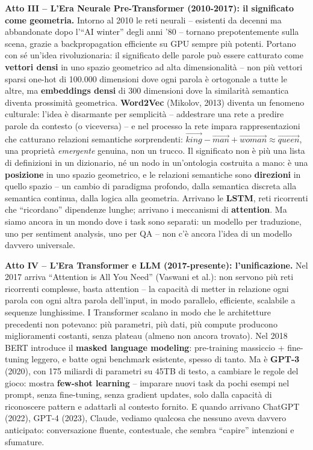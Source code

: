 \documentclass[12pt,a4paper]{article}
\begin{document}
\begin{defbox}
\textbf{Atto III -- L'Era Neurale Pre-Transformer (2010-2017): il significato come geometria.}
Intorno al 2010 le reti neurali -- esistenti da decenni ma abbandonate dopo l'``AI winter'' degli anni '80 -- tornano prepotentemente sulla scena, grazie a backpropagation efficiente su GPU sempre pi\`u potenti. Portano con s\'e un'idea rivoluzionaria: il significato delle parole pu\`o essere catturato come \textbf{vettori densi} in uno spazio geometrico ad alta dimensionalit\`a -- non pi\`u vettori sparsi one-hot di 100.000 dimensioni dove ogni parola \`e ortogonale a tutte le altre, ma \textbf{embeddings densi} di 300 dimensioni dove la similarit\`a semantica diventa prossimit\`a geometrica. \textbf{Word2Vec} (Mikolov, 2013) diventa un fenomeno culturale: l'idea \`e disarmante per semplicit\`a -- addestrare una rete a predire parole da contesto (o viceversa) -- e nel processo la rete impara rappresentazioni che catturano relazioni semantiche sorprendenti: $\vec{king}-\vec{man}+\vec{woman}\approx\vec{queen}$, una propriet\`a \emph{emergente} genuina, non un trucco. Il significato non \`e pi\`u una lista di definizioni in un dizionario, n\'e un nodo in un'ontologia costruita a mano: \`e una \textbf{posizione} in uno spazio geometrico, e le relazioni semantiche sono \textbf{direzioni} in quello spazio -- un cambio di paradigma profondo, dalla semantica discreta alla semantica continua, dalla logica alla geometria. Arrivano le \textbf{LSTM}, reti ricorrenti che ``ricordano'' dipendenze lunghe; arrivano i meccanismi di \textbf{attention}. Ma siamo ancora in un mondo dove i task sono separati: un modello per traduzione, uno per sentiment analysis, uno per QA -- non c'\`e ancora l'idea di un modello davvero universale.
\end{defbox}

\begin{defbox}
\textbf{Atto IV -- L'Era Transformer e LLM (2017-presente): l'unificazione.}
Nel 2017 arriva ``Attention is All You Need'' (Vaswani et al.): non servono pi\`u reti ricorrenti complesse, basta attention -- la capacit\`a di metter in relazione ogni parola con ogni altra parola dell'input, in modo parallelo, efficiente, scalabile a sequenze lunghissime. I Transformer scalano in modo che le architetture precedenti non potevano: pi\`u parametri, pi\`u dati, pi\`u compute producono miglioramenti costanti, senza plateau (almeno non ancora trovato). Nel 2018 BERT introduce il \textbf{masked language modeling}: pre-training massiccio + fine-tuning leggero, e batte ogni benchmark esistente, spesso di tanto. Ma \`e \textbf{GPT-3} (2020), con 175 miliardi di parametri su 45TB di testo, a cambiare le regole del gioco: mostra \textbf{few-shot learning} -- imparare nuovi task da pochi esempi nel prompt, senza fine-tuning, senza gradient updates, solo dalla capacit\`a di riconoscere pattern e adattarli al contesto fornito. E quando arrivano ChatGPT (2022), GPT-4 (2023), Claude, vediamo qualcosa che nessuno aveva davvero anticipato: conversazione fluente, contestuale, che sembra ``capire'' intenzioni e sfumature.
\end{defbox}
\end{document}
